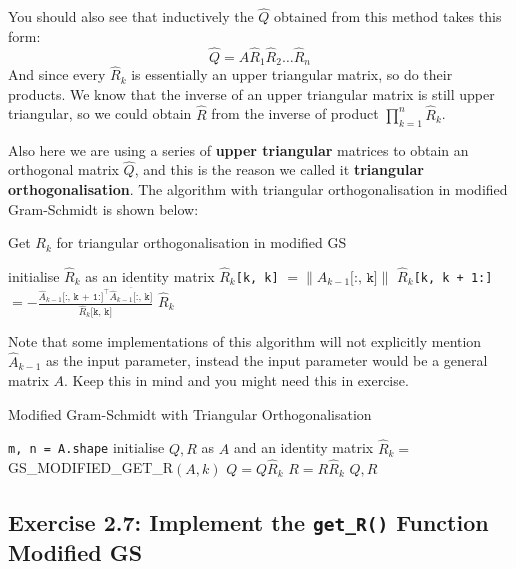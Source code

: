 \noindent You should also see that inductively the $\hat{Q}$ obtained from this method takes this form:
\[
\hat{Q} = A \hat{R}_1 \hat{R}_2 \ldots \hat{R}_n
\] 
And since every $\hat{R}_k$ is essentially an upper triangular matrix, so do their products. We know that the inverse of an upper triangular matrix is still upper triangular, so we could obtain $\hat{R}$ from the inverse of product $\prod_{k=1}^{n}\hat{R}_k$. \medskip

\noindent Also here we are using a series of \textbf{upper triangular} matrices to obtain an orthogonal matrix $\hat{Q}$, and this is the reason we called it \textbf{triangular orthogonalisation}. The algorithm with triangular orthogonalisation in modified Gram-Schmidt is shown below:

\begin{algorithm}[H]
  \caption{Get \(R_k\) for triangular orthogonalisation in modified GS}
  \label{mgs-get-r}
  \begin{algorithmic}[1]
    \State initialise \(\hat{R}_k\)  as an identity matrix
    \State \(\hat{R}_{k}\)\texttt{[k, k]} \(= \|\hat{A}_{k - 1}\texttt{[:, k]}\|\)
    \State \(\hat{R}_{k}\)\texttt{[k, k + 1:]} \(=- \frac{\hat{A}_{k - 1}\texttt{[:, k + 1:]}^{\top} \overline{\hat{A}_{k - 1}\texttt{[:, k]}}}{\hat{R}_{k}\texttt{[k, k]}}\)       
    \State \Return \(\hat{R}_k\)
  \EndProcedure
  \end{algorithmic}
  \end{algorithm}
\noindent Note that some implementations of this algorithm will not explicitly mention \(\hat{A}_{k - 1}\) as the input parameter, instead the input parameter would be a general matrix \(A\). Keep this in mind and you might need this in exercise. 
\begin{algorithm}[H]
  \caption{Modified Gram-Schmidt with Triangular Orthogonalisation}
  \label{mgs-r}
  \begin{algorithmic}[1]
    \State \texttt{m, n = A.shape}
    \State initialise \(Q, R\) as \(A\) and an identity matrix
      \State \(\hat{R}_k = \)  GS\_MODIFIED\_GET\_R\((A, k)\)
      \State \(Q = Q \hat{R}_{k}\)
      \State \(R = R \hat{R}_{k}\)     
    \EndFor
    \State \Return \(Q, R\)
  \EndProcedure
  \end{algorithmic}
  \end{algorithm}

  \subsection*{Exercise 2.7: Implement the \texttt{get\_R()} Function Modified GS}
